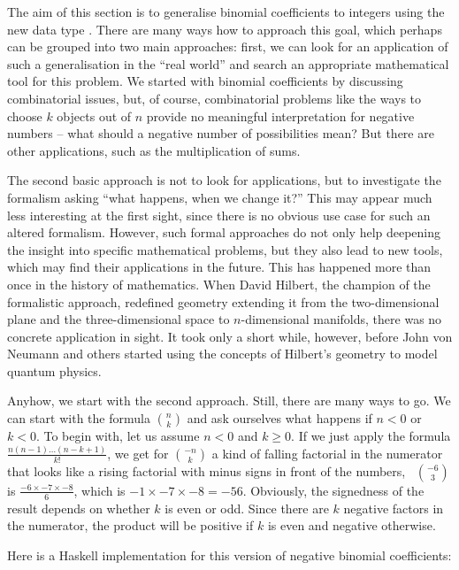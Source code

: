 \documentclass[tikz]{scrreprt}
\newcommand{\texfamily}{\fontfamily{cmtex}\selectfont}
\begin{document}
The aim of this section is to generalise
binomial coefficients to integers using
the new data type \text{\texfamily {\itshape Zahl}}.
There are many ways how to approach this goal,
which perhaps can be grouped into two main
approaches: first, we can look for an
application of such a generalisation in
the ``real world'' and search an appropriate
mathematical tool for this problem.
We started with binomial coefficients
by discussing combinatorial issues,
but, of course, combinatorial problems
like the ways to choose $k$ objects out of $n$
provide no meaningful interpretation for
negative numbers -- what should a negative
number of possibilities mean?
But there are other applications,
such as the multiplication of sums.

The second basic approach is not to look
for applications, but to investigate
the formalism asking ``what happens,
when we change it?''
This may appear much less interesting
at the first sight, since there is no
obvious use case for such an altered
formalism. However, such formal approaches
do not only help deepening the insight
into specific mathematical problems,
but they also lead to new tools, which
may find their applications in the future.
This has happened more than once in the
history of mathematics.
When David Hilbert, the champion of the
formalistic approach, redefined geometry
extending it from the two-dimensional plane
and the three-dimensional space to 
$n$-dimensional manifolds, there was no
concrete application in sight.
It took only a short while, however,
before John von Neumann and others started using
the concepts of Hilbert's geometry to model
quantum physics.

Anyhow, we start with the second approach.
Still, there are many ways to go.
We can start with the formula $\binom{n}{k}$
and ask ourselves what happens if
$n<0$ or $k<0$.
To begin with, let us assume
$n<0$ and $k\ge 0$.
If we just apply the formula
$\frac{n(n-1)\dots (n-k+1)}{k!}$,
we get for $\binom{-n}{k}$
a kind of falling factorial in the numerator
that looks like a rising factorial with minus signs
in front of the numbers, \eg\ $\binom{-6}{3}$ is
$\frac{-6 \times -7 \times -8}{6}$,
which is $-1 \times -7 \times -8 = -56$.
Obviously, the signedness of the result
depends on whether $k$ is even or odd.
Since there are $k$ negative factors 
in the numerator, the product will be positive
if $k$ is even and negative otherwise.

Here is a Haskell implementation
for this version of negative binomial
coefficients:
\end{document}

